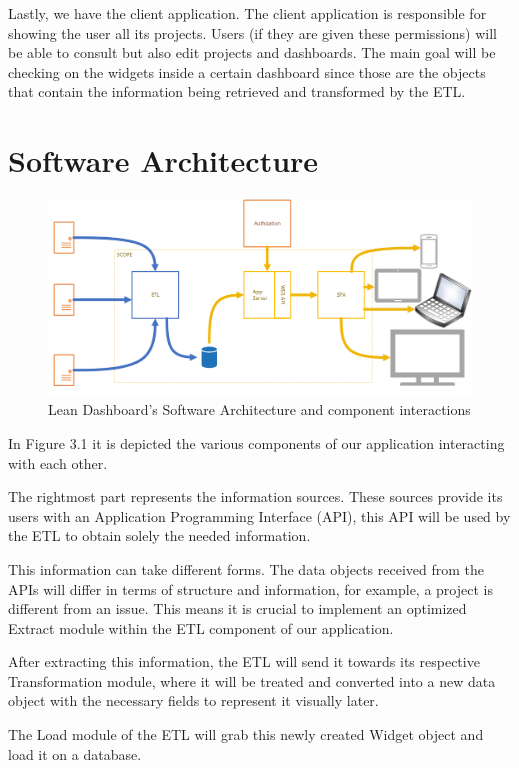 \documentclass[a4paper,twoside,10pt]{report}
\begin{document}
Lastly, we have the client application. The client application is responsible for showing the user all its projects. Users (if they are given these permissions) will be able to consult but also edit projects and dashboards. The main goal will be checking on the widgets inside a certain dashboard since those are the objects that contain the information being retrieved and transformed by the ETL.

\section{Software Architecture}
\begin{figure}[h!]
\center
  \includegraphics[width=\textwidth]{lean-dashboard-software-architecture.png}
  \caption{Lean Dashboard's Software Architecture and component interactions}
\end{figure}
In Figure 3.1 it is depicted the various components of our application interacting with each other.

The rightmost part represents the information sources. These sources provide its users with an Application Programming Interface (API), this API will be used by the ETL to obtain solely the needed information.

This information can take different forms. The data objects received from the APIs will differ in terms of structure and information, for example, a project is different from an issue. This means it is crucial to implement an optimized Extract module within the ETL component of our application.

After extracting this information, the ETL will send it towards its respective Transformation module, where it will be treated and converted into a new data object with the necessary fields to represent it visually later.

The Load module of the ETL will grab this newly created Widget object and load it on a database.
\end{document}
